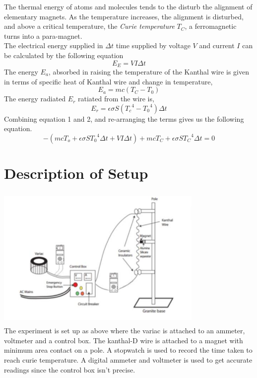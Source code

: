 The thermal energy of atoms and molecules tends to the disturb the alignment of elementary magnets. As the temperature increases, the alignment is disturbed, and above a critical temperature, the \textit{Curie temperature } $T_C$, a ferromagnetic turns into a para-magnet. \\
The electrical energy supplied in $\Delta t$ time supplied by voltage $V$ and current $I$ can be calculated by the following equation 
\begin{equation}
    E_E = V I \Delta t    
\end{equation}
The energy $E_a$, absorbed in raising the temperature of the Kanthal wire is given in terms of specific heat of Kanthal wire and change in temperature,
\begin{equation}
    E_a = mc(T_C - T_0)
\end{equation}
The energy radiated $E_r$ ratiated from the wire is,
\begin{equation}
    E_r = \epsilon \sigma S ({T_c}^4 - {T_0}^4)\Delta t
\end{equation}
Combining equation 1 and 2, and re-arranging the terms gives us the following equation.
\begin{equation}
    -(mcT_o + \epsilon \sigma S {T_0}^4 \Delta t + V I \Delta t) + m c T_C + \epsilon\sigma S {T_C}^4 \Delta t = 0
\end{equation}

\section{Description of Setup}
\includegraphics[width=10cm, height=7cm]{figures/fig9exp.png} \\
The experiment is set up as above where the variac is attached to an ammeter, voltmeter and a control box. The kanthal-D wire is attached to a magnet with minimum area contact on a pole. A stopwatch is used to record the time taken to reach curie temperature. A digital ammeter and voltmeter is used to get accurate readings since the control box isn't precise. 


